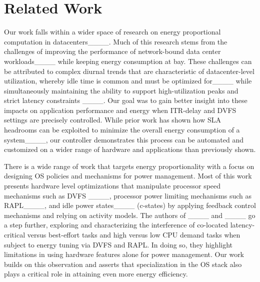 \section{Related Work}
\label{sec:related}
Our work falls within a wider space of research on energy proportional computation in datacenters____. Much of this research stems from the challenges of improving the performance of network-bound data center workloads____ while keeping energy consumption at bay. These challenges can be attributed to complex diurnal trends that are characteristic of datacenter-level utilization, whereby idle time is common and must be optimized for____ while simultaneously maintaining the ability to support high-utilization peaks and strict latency constraints ____. Our goal was to gain better insight into these impacts on application performance and energy when ITR-delay and DVFS settings are precisely controlled. While prior work has shown how SLA headrooms can be exploited to minimize the overall energy consumption of a system____, our controller demonstrates this process can be automated and customized on a wider range of hardware and applications than previously shown.

There is a wide range of work that targets energy proportionality with a focus on designing OS policies and mechanisms for power management. Most of this work presents hardware level optimizations that manipulate processor speed mechanisms such as DVFS ____, processor power limiting mechanisms such as RAPL____, and idle power states____ (c-states) by applying feedback control mechanisms and relying on activity models. The authors of ____ and ____ go a step further, exploring and characterizing the interference of co-located latency-critical versus best-effort tasks and high versus low CPU demand tasks when subject to energy tuning via DVFS and RAPL. In doing so, they highlight limitations in using hardware features alone for power management. Our work builds on this observation and asserts that specialization in the OS stack also plays a critical role in attaining even more energy efficiency. 

